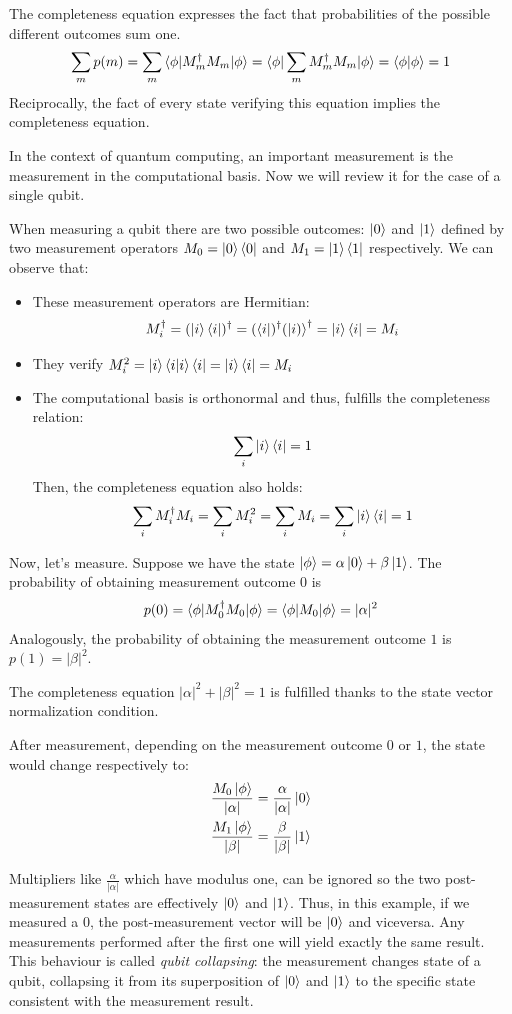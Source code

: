 The completeness equation expresses the fact that probabilities of the possible different outcomes sum one. 
    $$\sum_m p(m) = \sum_m \braket{\phi | M_m^{\dag}M_m | \phi } = \braket{\phi |\sum_m M_m^{\dag}M_m | \phi } = \braket{\phi|\phi} = 1$$
Reciprocally, the fact of every state verifying this equation implies the completeness equation.

In the context of quantum computing, an important measurement is the measurement in the computational basis. Now we will review it for the case of a single qubit. 

When measuring a qubit there are two possible outcomes: $\ket{0}$ and $\ket{1}$ defined by two measurement operators $M_0 = \ket{0}\bra{0}$ and $M_1=\ket{1} \bra{1}$ respectively. We can observe that:
\begin{itemize}
    \item These measurement operators are Hermitian: $$M_i^{\dag} = (\ket{i} \bra{i})^{\dag} = (\bra{i})^{\dag} (\ket{i)}^{\dag} = \ket{i} \bra{i} = M_i$$
    \item They verify $M_i^2 = \ket{i} \braket{i|i} \bra{i} = \ket{i} \bra{i} = M_i$
    \item The computational basis is orthonormal and thus, fulfills the completeness relation: 
    $$\sum_i \ket{i} \bra{i} = 1$$
    Then, the completeness equation also holds:
    $$\sum_i M_i^{\dag}M_i = \sum_i M_i^2 = \sum_i M_i = \sum_i \ket{i} \bra{i} = 1$$
\end{itemize}

Now, let's measure. Suppose we have the state $\ket{\phi} = \alpha \ket{0} + \beta \ket{1}$. The probability of obtaining measurement outcome $0$ is 
$$p(0)=\braket{\phi | M_0^{\dag}M_0 | \phi } = \braket{\phi | M_0 | \phi} = |\alpha|^2$$
Analogously, the probability of obtaining the measurement outcome $1$ is $p(1)=|\beta|^2$.

The completeness equation $|\alpha|^2 + |\beta|^2 = 1$ is fulfilled thanks to the state vector normalization condition. 

After measurement, depending on the measurement outcome $0$ or $1$, the state would change respectively to:
\begin{align}
    \frac{M_0 \ket{\phi}}{|\alpha|} &= \frac{\alpha}{|\alpha|}\ket{0} \\
    \frac{M_1 \ket{\phi}}{|\beta|} &= \frac{\beta}{|\beta|}\ket{1} 
\end{align}

Multipliers like $\frac{\alpha}{|\alpha|}$ which have modulus one, can be ignored so the two post-measurement states are effectively $\ket{0}$ and $\ket{1}$. Thus, in this example, if we measured a $0$, the post-measurement vector will be $\ket{0}$ and viceversa. Any measurements performed after the first one will yield exactly the same result. This behaviour is called \textit{qubit collapsing}: the measurement changes state of a qubit, collapsing it from its superposition of $\ket{0}$ and $\ket{1}$ to the specific state consistent with the measurement result.

